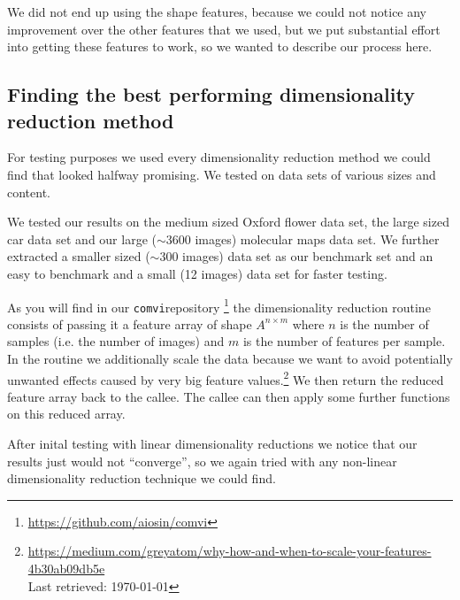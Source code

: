\documentclass[journal]{vgtc}       %
\newcommand{\todo}[1]{\textcolor{red}{\textbf{TODO:} #1}}
\begin{document}
We did not end up using the shape features, because we could not notice any improvement over the other features that we used, but we put substantial effort into getting these features to work, so we wanted to describe our process here.




\subsection{Finding the best performing  dimensionality reduction method}\label{subsec:dimred}
For testing purposes we used every dimensionality reduction method we could find that looked halfway promising. We tested on data sets of various sizes and content.

We tested our results on the medium sized Oxford flower data set\cite{flower}, the large sized car  data set \cite{stanfordcar} and our large ($\sim$3600 images) molecular maps data set. 
We further extracted a smaller sized ($\sim$300 images) data set as our benchmark set  and an easy to benchmark and a small (12 images) data set for faster testing. 

As you will find in our \verb|comvi|repository \footnote{\url{https://github.com/aiosin/comvi}} the dimensionality reduction routine consists of passing it a feature array of shape \(A^{n\times m}\) where \(n\) is the number of samples (i.e. the number of images) and \(m\) is the number of features per sample.
In the routine we additionally scale the data because we want to avoid potentially unwanted effects caused by very big feature values.\footnote{\url{https://medium.com/greyatom/why-how-and-when-to-scale-your-features-4b30ab09db5e} \\ Last retrieved: \today}
We then return the reduced feature array back to the callee. The callee can then apply some  further  functions on this reduced array.

After inital testing with linear dimensionality reductions we notice that our results just would not ``converge'', so we again tried with any non-linear dimensionality reduction technique we could find.
\end{document}
